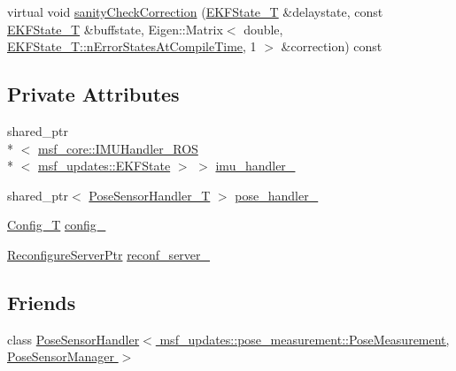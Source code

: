\begin{DoxyCompactItemize}
\item 
virtual void \hyperlink{classmsf__pose__sensor_1_1PoseSensorManager_abb254c0024778abb6ffe40c4e2ca93bf}{sanity\-Check\-Correction} (\hyperlink{classmsf__pose__sensor_1_1PoseSensorManager_a1b470ca74ac6b8d26ccfe503d3387422}{E\-K\-F\-State\-\_\-\-T} \&delaystate, const \hyperlink{classmsf__pose__sensor_1_1PoseSensorManager_a1b470ca74ac6b8d26ccfe503d3387422}{E\-K\-F\-State\-\_\-\-T} \&buffstate, Eigen\-::\-Matrix$<$ double, \hyperlink{structmsf__core_1_1GenericState__T_a20545d9aacd8f84bc1a97a873310cd5fab0136c5805e4e8d75677885fcaad5901}{E\-K\-F\-State\-\_\-\-T\-::n\-Error\-States\-At\-Compile\-Time}, 1 $>$ \&correction) const 
\end{DoxyCompactItemize}
\subsection*{Private Attributes}
\begin{DoxyCompactItemize}
\item 
shared\-\_\-ptr\\*
$<$ \hyperlink{classmsf__core_1_1IMUHandler__ROS}{msf\-\_\-core\-::\-I\-M\-U\-Handler\-\_\-\-R\-O\-S}\\*
$<$ \hyperlink{namespacemsf__updates_a03b0801c76b7400623b00ad4d28f9bcc}{msf\-\_\-updates\-::\-E\-K\-F\-State} $>$ $>$ \hyperlink{classmsf__pose__sensor_1_1PoseSensorManager_a38fc6226c050906f832f4ebe6b8850b8}{imu\-\_\-handler\-\_\-}
\item 
shared\-\_\-ptr$<$ \hyperlink{classmsf__pose__sensor_1_1PoseSensorManager_a424c57464ea7530998340db1e820688a}{Pose\-Sensor\-Handler\-\_\-\-T} $>$ \hyperlink{classmsf__pose__sensor_1_1PoseSensorManager_ac702142a3e76879a35472d2a89c66aeb}{pose\-\_\-handler\-\_\-}
\item 
\hyperlink{namespacemsf__pose__sensor_a1d993c8c6010718666c4e9dc159bd3dd}{Config\-\_\-\-T} \hyperlink{classmsf__pose__sensor_1_1PoseSensorManager_a1841c27fc6dc387bb1eb0d00bf28f9bb}{config\-\_\-}
\item 
\hyperlink{namespacemsf__pose__sensor_a00a515ed2b3f3664f6db2ab912956d05}{Reconfigure\-Server\-Ptr} \hyperlink{classmsf__pose__sensor_1_1PoseSensorManager_a7359d04f3db7cb6e8e23b5e28f900423}{reconf\-\_\-server\-\_\-}
\end{DoxyCompactItemize}
\subsection*{Friends}
\begin{DoxyCompactItemize}
\item 
class \hyperlink{classmsf__pose__sensor_1_1PoseSensorManager_a2a62386baba5f8248691960adce2e606}{Pose\-Sensor\-Handler$<$ msf\-\_\-updates\-::pose\-\_\-measurement\-::\-Pose\-Measurement, Pose\-Sensor\-Manager $>$}
\end{DoxyCompactItemize}
